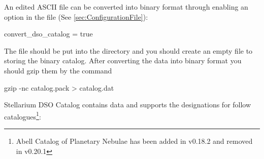An edited ASCII file can be converted into binary format through enabling an option in the file  (See \ref{sec:ConfigurationFile}):
\begin{configfile}
[devel]
convert_dso_catalog = true
\end{configfile}

The file  should be put into the directory
 and you should create an empty 
file  to storing the binary catalog. After converting the data into binary format 
you should gzip them by the command 
\begin{commands}
gzip -nc catalog.pack > catalog.dat
\end{commands}

Stellarium DSO Catalog contains data and supports the designations for
follow catalogues\footnote{Abell Catalog of Planetary Nebulae has been added in v0.18.2 and removed in v0.20.1}:

